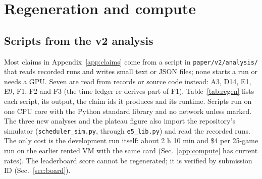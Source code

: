 \section{Regeneration and compute}\label{app:regen}

\subsection{Scripts from the v2 analysis}

Most claims in Appendix~\ref{app:claims} come from a script in \texttt{paper/v2/analysis/} that reads recorded runs and writes small text or JSON files; none starts a run or needs a GPU. Seven are read from records or source code instead: A3, D14, E1, E9, F1, F2 and F3 (the time ledger re-derives part of F1). %
Table~\ref{tab:regen} lists each script, its output, the claim ids it produces and its runtime. Scripts run on one CPU core with the Python standard library and no network unless marked. The three new analyses and the plateau figure also import the repository's simulator (\texttt{scheduler\_sim.py}, through \texttt{e5\_lib.py}) and read the recorded runs.
The only cost is the development run itself: about 2 h 10 min and \$4 per 25-game run on the earlier rented VM with the same card (Sec.~\ref{app:compute} has current rates). %
The leaderboard score cannot be regenerated; it is verified by submission ID (Sec.~\ref{sec:board}). %

